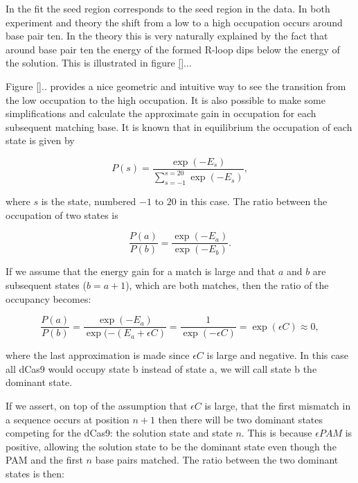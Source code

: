In the fit the seed region corresponds to the seed region in the data. In both experiment and theory the shift from a low to a high occupation occurs around base pair ten. In the theory this is very naturally explained by the fact that around base pair ten the energy of the formed R-loop dips below the energy of the solution. This is illustrated in figure \ref{}... %


Figure \ref{}.. %
provides a nice geometric and intuitive way to see the transition from the low occupation to the high occupation. It is also possible to make some simplifications and calculate the approximate gain in occupation for each subsequent matching base. It is known that in equilibrium the occupation of each state is given by

\begin{equation}
P(s) = \frac{\exp(-E_s)}{\sum_{s=-1}^{s=20}\exp(-E_s)},
\end{equation}

where $s$ is the state, numbered $-1$ to $20$ in this case. The ratio between the occupation of two states is

\begin{equation}
\frac{P(a)}{P(b)} = \frac{\exp(-E_a)}{\exp(-E_b)}.
\end{equation}

If we assume that the energy gain for a match is large and that $a$ and $b$ are subsequent states ($b = a+1$), which are both matches, then the ratio of the occupancy becomes:

\begin{equation}
\frac{P(a)}{P(b)} = \frac{\exp(-E_a)}{\exp(-(E_a + \epsilon C)} = \frac{1}{\exp(-\epsilon C)} = \exp(\epsilon C) \approx 0,
\end{equation}

where the last approximation is made since $\epsilon C$ is large and negative. In this case all dCas9 would occupy state b instead of state a, we will call state b the dominant state.

If we assert, on top of the assumption that $\epsilon C$ is large, that the first mismatch in a sequence occurs at position $n+1$ then there will be two dominant states competing for the dCas9: the solution state and state $n$. This is because $\epsilon PAM$ is positive, allowing the solution state to be the dominant state even though the PAM and the first $n$ base pairs matched. The ratio between the two dominant states is then:

